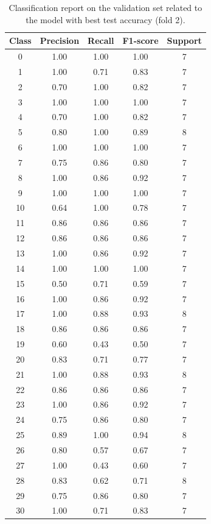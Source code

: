 \documentclass{article}
\begin{document}
\begin{sloppy}
\begin{table}[ht]
  \centering
  \caption{Classification report on the validation set related to the model with best test accuracy (fold 2).}
  \label{tab:validation_report}
\begin{tabular}{|c|c|c|c|c|}
  \hline
  Class & Precision & Recall & F1-score & Support \\
  \hline
  0  & 1.00 & 1.00 & 1.00 & 7 \\
  1  & 1.00 & 0.71 & 0.83 & 7 \\
  2  & 0.70 & 1.00 & 0.82 & 7 \\
  3  & 1.00 & 1.00 & 1.00 & 7 \\
  4  & 0.70 & 1.00 & 0.82 & 7 \\
  5  & 0.80 & 1.00 & 0.89 & 8 \\
  6  & 1.00 & 1.00 & 1.00 & 7 \\
  7  & 0.75 & 0.86 & 0.80 & 7 \\
  8  & 1.00 & 0.86 & 0.92 & 7 \\
  9  & 1.00 & 1.00 & 1.00 & 7 \\
  10 & 0.64 & 1.00 & 0.78 & 7 \\
  11 & 0.86 & 0.86 & 0.86 & 7 \\
  12 & 0.86 & 0.86 & 0.86 & 7 \\
  13 & 1.00 & 0.86 & 0.92 & 7 \\
  14 & 1.00 & 1.00 & 1.00 & 7 \\
  15 & 0.50 & 0.71 & 0.59 & 7 \\
  16 & 1.00 & 0.86 & 0.92 & 7 \\
  17 & 1.00 & 0.88 & 0.93 & 8 \\
  18 & 0.86 & 0.86 & 0.86 & 7 \\
  19 & 0.60 & 0.43 & 0.50 & 7 \\
  20 & 0.83 & 0.71 & 0.77 & 7 \\
  21 & 1.00 & 0.88 & 0.93 & 8 \\
  22 & 0.86 & 0.86 & 0.86 & 7 \\
  23 & 1.00 & 0.86 & 0.92 & 7 \\
  24 & 0.75 & 0.86 & 0.80 & 7 \\
  25 & 0.89 & 1.00 & 0.94 & 8 \\
  26 & 0.80 & 0.57 & 0.67 & 7 \\
  27 & 1.00 & 0.43 & 0.60 & 7 \\
  28 & 0.83 & 0.62 & 0.71 & 8 \\
  29 & 0.75 & 0.86 & 0.80 & 7 \\
  30 & 1.00 & 0.71 & 0.83 & 7 \\

\end{tabular}
\end{table}
\end{sloppy}
\end{document}
